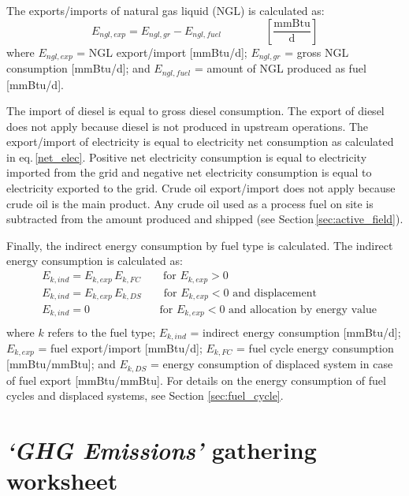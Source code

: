 \documentclass[11pt]{report}
\newcommand{\sheet}[1]{\textit{`{#1}'}}
\newcommand{\eqnunitfrac}[2]{\quad\quad \scriptstyle{\left[\frac{\text{#1}}{\text{#2}}\right]}}
\begin{document}
The exports/imports of natural gas liquid (NGL) is calculated as:
\begin{equation}
E_{ngl,exp} = E_{ngl,gr} - E_{ngl,fuel} \quad\quad\eqnunitfrac{mmBtu}{d}
\end{equation}
where $E_{ngl,exp}$ = NGL export/import [mmBtu/d]; $E_{ngl,gr}$ = gross NGL consumption [mmBtu/d]; and $E_{ngl,fuel}$ = amount of NGL produced as fuel [mmBtu/d]. 

The import of diesel is equal to gross diesel consumption. The export of diesel does not apply because diesel is not produced in upstream operations. The export/import of electricity is equal to electricity net consumption as calculated in eq.\,\eqref{net_elec}. Positive net electricity consumption is equal to electricity imported from the grid and negative net electricity consumption is equal to electricity exported to the grid. Crude oil export/import does not apply because crude oil is the main product. Any crude oil used as a process fuel on site is subtracted from the amount produced and shipped (see Section\,\ref{sec:active_field}).

Finally, the indirect energy consumption by fuel type is calculated. The indirect energy consumption is calculated as:
\begin{equation}
\begin{split}
& E_{k,ind} = E_{k,exp} \, E_{k,FC} \quad\quad \text{for}\,\, E_{k,exp} > 0\\
& E_{k,ind} = E_{k,exp} \, E_{k,DS} \quad\quad \text{for}\,\, E_{k,exp} < 0 \,\,\text{and displacement}\\ 
& E_{k,ind} = 0 \quad\quad\quad\quad\quad\quad\,\, \text{for}\,\, E_{k,exp} < 0 \,\,\text{and allocation by energy value}\\
\end{split}
\end{equation}
where $k$ refers to the fuel type; $E_{k,ind}$ = indirect energy consumption [mmBtu/d]; $E_{k,exp}$ = fuel export/import [mmBtu/d]; $E_{k,FC}$ = fuel cycle energy consumption [mmBtu/mmBtu]; and $E_{k,DS}$ = energy consumption of displaced system in case of fuel export [mmBtu/mmBtu]. For details on the energy consumption of fuel cycles and displaced systems, see Section \ref{sec:fuel_cycle}.


\clearpage

\section{\sheet{GHG Emissions} gathering worksheet}\label{sec:GHG_emissions}
\end{document}

